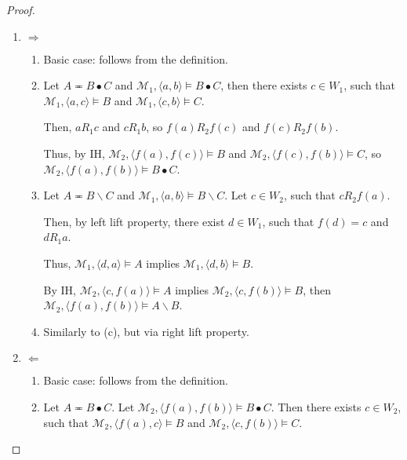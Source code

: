 \documentclass[a4paper]{article}
\theoremstyle{defin}
\theoremstyle{theorem}
\theoremstyle{prop}
\theoremstyle{lemma}
\theoremstyle{ex}
\theoremstyle{col}
\begin{document}
\begin{proof}
$ $

  \begin{enumerate}
    \item $\Rightarrow$
      \begin{enumerate}
        \item Basic case: follows from the definition.
        \item Let $A \eqcirc B \bullet C$ and $\mathcal{M}_1, \langle a, b \rangle \models B \bullet C$, then
        there exists $c \in W_1$, such that $\mathcal{M}_1, \langle a, c \rangle \models B$ and
        $\mathcal{M}_1, \langle c, b \rangle \models C$.

        Then, $a R_1 c$ and $c R_1 b$, so $f(a) R_2 f(c)$ and $f(c) R_2 f(b)$.

        Thus, by IH, $\mathcal{M}_2, \langle f(a), f(c) \rangle \models B$ and
        $\mathcal{M}_2, \langle f(c), f(b) \rangle \models C$, so $\mathcal{M}_2, \langle f(a), f(b) \rangle \models B \bullet C$.
        \item Let $A \eqcirc B \backslash C$ and $\mathcal{M}_1, \langle a, b \rangle \models B \backslash C$.
        Let $c \in W_2$, such that $c R_2 f(a)$.

        Then, by left lift property, there exist $d \in W_1$, such that $f(d) = c$ and $d R_1 a$.

        Thus, $\mathcal{M}_1, \langle d, a \rangle \models A$ implies
        $\mathcal{M}_1, \langle d, b \rangle \models B$.

        By IH, $\mathcal{M}_2, \langle c, f(a) \rangle \models A$ implies
        $\mathcal{M}_2, \langle c, f(b) \rangle \models B$, then $\mathcal{M}_2, \langle f(a), f(b) \rangle \models A \backslash B$.

        \item Similarly to (c), but via right lift property.
      \end{enumerate}
    \item $\Leftarrow$
    \begin{enumerate}
      \item Basic case: follows from the definition.

      \item Let $A \eqcirc B \bullet C$.
      Let $\mathcal{M}_2, \langle f(a), f(b) \rangle \models B \bullet C$. Then
      there exists $c \in W_2$, such that $\mathcal{M}_2, \langle f(a), c \rangle \models B$ and
      $\mathcal{M}_2, \langle c, f(b) \rangle \models C$.


\end{enumerate}
\end{enumerate}
\end{proof}
\end{document}
